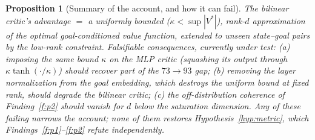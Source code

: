\documentclass[10pt]{article}
\newtheorem{proposition}{Proposition}
\begin{document}
\begin{proposition}[Summary of the account, and how it can fail]
The bilinear critic's advantage $=$ a uniformly bounded ($\kappa<\sup|V^*|$), rank-$d$
approximation of the optimal goal-conditioned value function, extended to unseen
state--goal pairs by the low-rank constraint. Falsifiable consequences, currently under
test: (a) imposing the same bound $\kappa$ on the MLP critic (squashing its output
through $\kappa\tanh(\cdot/\kappa)$) should recover part of the $73\to93$ gap;
(b) removing the layer normalization from the goal embedding, which destroys the uniform
bound at fixed rank, should degrade the bilinear critic; (c) the off-distribution
coherence of Finding~\ref{f:p2} should vanish for $d$ below the saturation dimension.
Any of these failing narrows the account; none of them restores
Hypothesis~\ref{hyp:metric}, which Findings~\ref{f:p1}--\ref{f:p2} refute independently.
\end{proposition}
\end{document}
